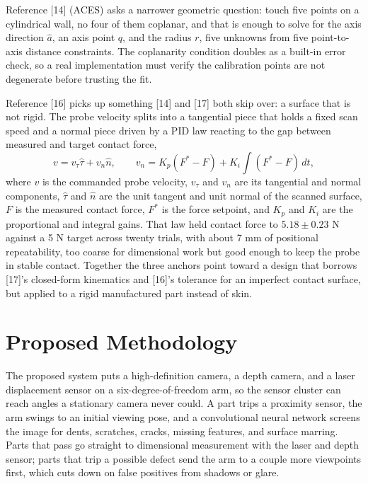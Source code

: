 \documentclass[conference]{IEEEtran}
\begin{document}
Reference {[}14{]} (ACES) asks a narrower geometric question: touch five points on a cylindrical wall, no four of them coplanar, and that is enough to solve for the axis direction $\hat a$, an axis point $q$, and the radius $r$, five unknowns from five point-to-axis distance constraints. The coplanarity condition doubles as a built-in error check, so a real implementation must verify the calibration points are not degenerate before trusting the fit.

Reference {[}16{]} picks up something {[}14{]} and {[}17{]} both skip over: a surface that is not rigid. The probe velocity splits into a tangential piece that holds a fixed scan speed and a normal piece driven by a PID law reacting to the gap between measured and target contact force,
\begin{equation}
v = v_\tau \hat\tau + v_n \hat n, \qquad v_n = K_p(F^* - F) + K_i\!\int (F^*-F)\,dt,
\label{eq:force}
\end{equation}
where $v$ is the commanded probe velocity, $v_\tau$ and $v_n$ are its tangential and normal components, $\hat\tau$ and $\hat n$ are the unit tangent and unit normal of the scanned surface, $F$ is the measured contact force, $F^*$ is the force setpoint, and $K_p$ and $K_i$ are the proportional and integral gains. That law held contact force to $5.18 \pm 0.23$ N against a 5 N target across twenty trials, with about 7 mm of positional repeatability, too coarse for dimensional work but good enough to keep the probe in stable contact. Together the three anchors point toward a design that borrows {[}17{]}'s closed-form kinematics and {[}16{]}'s tolerance for an imperfect contact surface, but applied to a rigid manufactured part instead of skin.

\section{Proposed Methodology}
The proposed system puts a high-definition camera, a depth camera, and a laser displacement sensor on a six-degree-of-freedom arm, so the sensor cluster can reach angles a stationary camera never could. A part trips a proximity sensor, the arm swings to an initial viewing pose, and a convolutional neural network screens the image for dents, scratches, cracks, missing features, and surface marring. Parts that pass go straight to dimensional measurement with the laser and depth sensor; parts that trip a possible defect send the arm to a couple more viewpoints first, which cuts down on false positives from shadows or glare.
\end{document}
